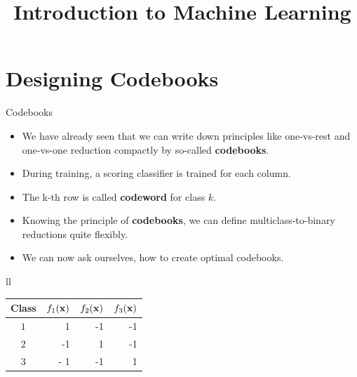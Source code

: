 \documentclass[11pt,compress,t,notes=noshow, xcolor=table]{beamer}
\title{Introduction to Machine Learning}
\date{}
\begin{document}




\sloppy

\section{Designing Codebooks}

\begin{vbframe}{Codebooks}

  \begin{itemize}
\item We have already seen that we can write down principles like one-vs-rest and one-vs-one reduction compactly by so-called \textbf{codebooks}. 
\item During training, a scoring classifier is trained for each column.
\item The k-th row is called \textbf{codeword} for class $k$.
\item Knowing the principle of \textbf{codebooks}, we can define multiclass-to-binary reductions quite flexibly.
\item We can now ask ourselves, how to create optimal codebooks.
\end{itemize}

  \begin{center}
  \begin{footnotesize}
  \begin{tabular}{ll}
    \begin{tabular}{|c|r|r|r|} \hline
    \textbf{Class}  & \textbf{$f_1{(\mathbf{x})}$} & \textbf{$f_2{(\mathbf{x})}$}  & \textbf{$f_3{(\mathbf{x})}$} \\ \hline
    \textbf{$1$}  &   1                 & -1                   & -1                   \\ \hline
    \textbf{$2$}  &  -1                 &  1                   & -1                   \\ \hline
    \textbf{$3$}  & - 1                 & -1                   &  1                   \\ \hline


\end{tabular}
\end{tabular}
\end{footnotesize}
\end{center}
\end{vbframe}
\end{document}
